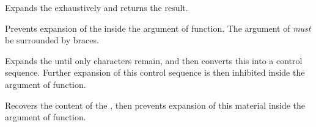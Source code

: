 \documentclass[oneside]{book}
\let\tn=\cs
\begin{document}
\begin{function}{\expWhole}
\begin{syntax}
 
\end{syntax}
Expands the  exhaustively and returns the result.
\end{function}

\begin{function}{\unExpand}
\begin{syntax}
 
\end{syntax}
Prevents expansion of the  inside the argument of  function.
The argument of  \emph{must} be surrounded by braces.
\end{function}

\begin{function}{\onlyName}
\begin{syntax}
 
\end{syntax}
Expands the  until only characters remain, and then
converts this into a control sequence.
Further expansion of this control sequence is then inhibited
inside the argument of  function.
\end{function}

\begin{function}{\onlyValue}
\begin{syntax}
 
\end{syntax}
Recovers the content of the , then prevents expansion
of this material inside the argument of  function.
\end{function}
\end{document}
